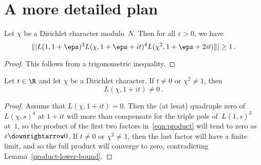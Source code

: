 \section{A more detailed plan}

\begin{lemma} \label{product-lower-bound}
  \leanok
  Let $\chi$ be a Dirichlet character modulo~$N$. Then for all $\varepsilon > 0$, we have
  \begin{equation} \label {eqn:product}
    \||L(1, 1 + \eps)^3 L(\chi, 1 + \eps + it)^4 L(\chi^2, 1 + \eps + 2it)\|| \ge 1 \,.
  \end{equation}
\end{lemma}

\begin{proof}
  \leanok
  This follows from a trigonometric inequality.
\end{proof}

\begin{lemma} \label{non-quadratic}
  Let $t \in \R$ and let $\chi$ be a Dirichlet character. If $t \ne 0$ or $\chi^2 \ne 1$, then
  \[ L(\chi, 1 + it) \ne 0 \,. \]
\end{lemma}

\begin{proof}
  Assume that $L(\chi, 1 + it) = 0$. Then the (at lesat) quadruple zero of~$L(\chi, s)^4$ at $1 + it$
  will more than compensate for the triple pole of~$L(1, s)^3$ at~$1$, so the product of the first
  two factors in~\eqref{eqn:product} will tend to zero as $\varepsilon \downrightarrow 0$.
  If $t \ne 0$ or $\chi^2 \ne 1$, then the last factor will have a finite limit, and so the
  full product will converge to zero, contradicting Lemma~\ref{product-lower-bound}.
\end{proof}
